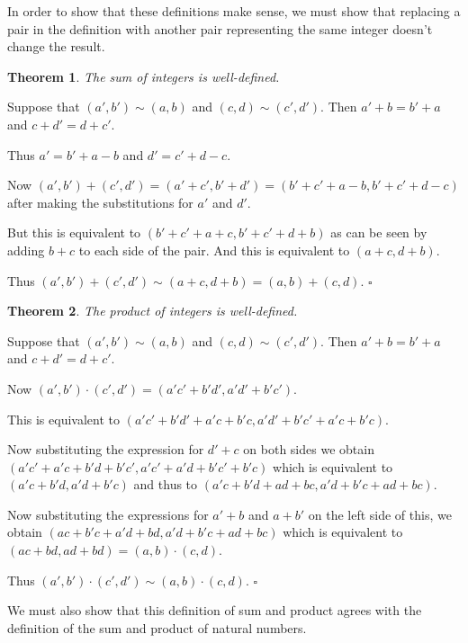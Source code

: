 \documentclass[10pt]{article}
\newcommand{\qed}{\square}
\newtheorem{theorem}{Theorem}[section]
\newenvironment{proof}[1][Proof]{\begin{trivlist}
\item[\hskip \labelsep {\bfseries #1}]}{\end{trivlist}}
\begin{document}
In order to show that these definitions make sense, we must show that replacing a pair in the definition with another pair representing the same integer doesn't change the result.

\begin{theorem}
The sum of integers is well-defined.
\end{theorem}

\begin{proof}
Suppose that $(a', b') \sim (a, b)$ and $(c, d) \sim (c', d')$. Then $a' + b = b' + a$ and $c + d' = d + c'$.

Thus $a' = b' + a - b$ and $d' = c' + d - c$.

Now $(a', b') + (c', d') = (a' + c', b' + d') = (b' + c' + a - b, b' + c' + d - c)$ after making the substitutions for $a'$ and $d'$.

But this is equivalent to $(b' + c' + a + c, b' + c' + d + b)$ as can be seen by adding $b + c$ to each side of the pair. And this is equivalent to $(a + c, d + b)$.

Thus $(a', b') + (c', d') \sim (a + c, d + b) = (a, b) + (c, d)$. $\qed$
\end{proof}

\begin{theorem}
The product of integers is well-defined.
\end{theorem}

\begin{proof}
Suppose that $(a', b') \sim (a, b)$ and $(c, d) \sim (c', d')$. Then $a' + b = b' + a$ and $c + d' = d + c'$.

Now $(a', b')\cdot (c', d') = (a'c' + b'd', a'd' + b'c')$.

This is equivalent to $(a'c' + b'd' + a'c + b'c, a'd' + b'c' + a'c + b'c)$. 

Now substituting the expression for $d' + c$ on both sides we obtain $(a'c' + a'c + b'd + b'c', a'c' + a'd + b'c' + b'c)$ which is equivalent to $(a'c + b'd, a'd + b'c)$ and thus to $(a'c + b'd + ad + bc, a'd + b'c + ad + bc)$. 

Now substituting the expressions for $a' + b$ and $a + b'$ on the left side of this, we obtain $(ac + b'c + a'd + bd, a'd + b'c + ad + bc)$ which is equivalent to $(ac + bd, ad + bd) = (a, b)\cdot (c, d)$.

Thus $(a', b')\cdot (c', d') \sim (a, b)\cdot (c, d)$.
$\qed$
\end{proof}

We must also show that this definition of sum and product agrees with the definition of the sum and product of natural numbers.
\end{document}
